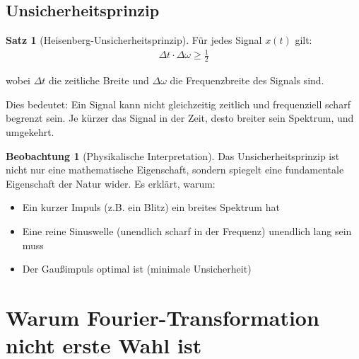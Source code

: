 ﻿\documentclass[a4paper,12pt]{report}
\theoremstyle{definition}
\newtheorem{satz}{Satz}
\newtheorem{beobachtung}{Beobachtung}
\begin{document}
	\subsection{Unsicherheitsprinzip}
	
	\begin{satz}[Heisenberg-Unsicherheitsprinzip]
		Für jedes Signal $x(t)$ gilt:
		\begin{align}
			\Delta t \cdot \Delta \omega \geq \frac{1}{2}
		\end{align}
		
		wobei $\Delta t$ die zeitliche Breite und $\Delta \omega$ die Frequenzbreite des Signals sind.
		
		Dies bedeutet: Ein Signal kann nicht gleichzeitig zeitlich und frequenziell scharf begrenzt sein. Je kürzer das Signal in der Zeit, desto breiter sein Spektrum, und umgekehrt.
	\end{satz}
	
	\begin{beobachtung}[Physikalische Interpretation]
		Das Unsicherheitsprinzip ist nicht nur eine mathematische Eigenschaft, sondern spiegelt eine fundamentale Eigenschaft der Natur wider. Es erklärt, warum:
		\begin{itemize}
			\item[-] Ein kurzer Impuls (z.B. ein Blitz) ein breites Spektrum hat
			\item[-] Eine reine Sinuswelle (unendlich scharf in der Frequenz) unendlich lang sein muss
			\item[-] Der Gaußimpuls optimal ist (minimale Unsicherheit)
		\end{itemize}
	\end{beobachtung}
	
	\section{Warum Fourier-Transformation nicht erste Wahl ist}
	
\end{document}
